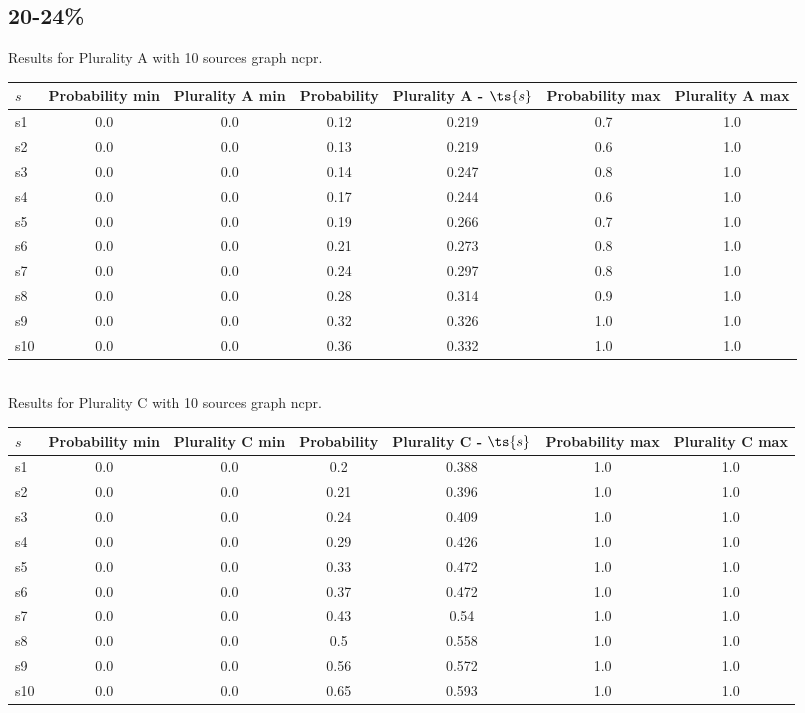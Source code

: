 \documentclass{article}
\begin{document}
\newpage

\subsection{20-24\%}

\noindent Results for Plurality A with 10 sources graph ncpr.

\noindent\begin{tabular}{|l|c|c|c|c|c|c|}
\hline
$s$& Probability min & Plurality A min & Probability & Plurality A - $\ts{s}$ & Probability max & Plurality A max\\
\hline
s1 &0.0 & 0.0 & 0.12 & 0.219 & 0.7 & 1.0\\
\hline
s2 &0.0 & 0.0 & 0.13 & 0.219 & 0.6 & 1.0\\
\hline
s3 &0.0 & 0.0 & 0.14 & 0.247 & 0.8 & 1.0\\
\hline
s4 &0.0 & 0.0 & 0.17 & 0.244 & 0.6 & 1.0\\
\hline
s5 &0.0 & 0.0 & 0.19 & 0.266 & 0.7 & 1.0\\
\hline
s6 &0.0 & 0.0 & 0.21 & 0.273 & 0.8 & 1.0\\
\hline
s7 &0.0 & 0.0 & 0.24 & 0.297 & 0.8 & 1.0\\
\hline
s8 &0.0 & 0.0 & 0.28 & 0.314 & 0.9 & 1.0\\
\hline
s9 &0.0 & 0.0 & 0.32 & 0.326 & 1.0 & 1.0\\
\hline
s10 &0.0 & 0.0 & 0.36 & 0.332 & 1.0 & 1.0\\
\hline
\end{tabular}\\

\noindent Results for Plurality C with 10 sources graph ncpr.

\noindent\begin{tabular}{|l|c|c|c|c|c|c|}
\hline
$s$& Probability min & Plurality C min & Probability & Plurality C - $\ts{s}$ & Probability max & Plurality C max\\
\hline
s1 &0.0 & 0.0 & 0.2 & 0.388 & 1.0 & 1.0\\
\hline
s2 &0.0 & 0.0 & 0.21 & 0.396 & 1.0 & 1.0\\
\hline
s3 &0.0 & 0.0 & 0.24 & 0.409 & 1.0 & 1.0\\
\hline
s4 &0.0 & 0.0 & 0.29 & 0.426 & 1.0 & 1.0\\
\hline
s5 &0.0 & 0.0 & 0.33 & 0.472 & 1.0 & 1.0\\
\hline
s6 &0.0 & 0.0 & 0.37 & 0.472 & 1.0 & 1.0\\
\hline
s7 &0.0 & 0.0 & 0.43 & 0.54 & 1.0 & 1.0\\
\hline
s8 &0.0 & 0.0 & 0.5 & 0.558 & 1.0 & 1.0\\
\hline
s9 &0.0 & 0.0 & 0.56 & 0.572 & 1.0 & 1.0\\
\hline
s10 &0.0 & 0.0 & 0.65 & 0.593 & 1.0 & 1.0\\
\hline
\end{tabular}\\
\end{document}

